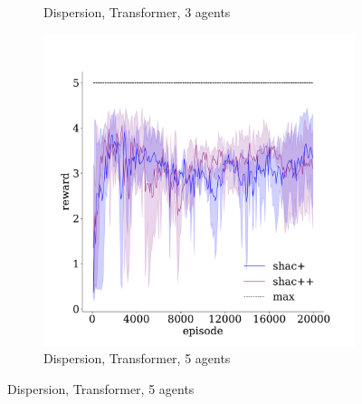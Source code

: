 \begin{figure}[!t]
\begin{subfigure}[b]{0.30\textwidth}
        \caption{Dispersion, Transformer, 3 agents}
        \label{fig:dispersion-ablation-transformer-3}
    \end{subfigure}
    \begin{subfigure}[b]{0.30\textwidth}
        \includegraphics[width=\textwidth]{figs/dispersion-ablation-5-transformer.pdf}
        \caption{Dispersion, Transformer, 5 agents}
        \label{fig:dispersion-ablation-transformer-5}
    \end{subfigure}


\end{figure}
